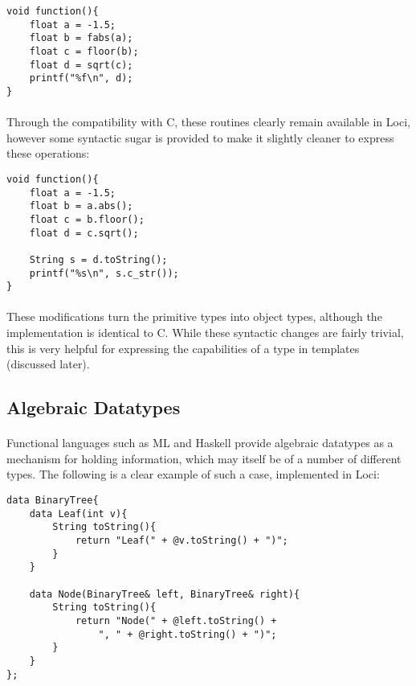 \documentclass[12pt,twoside,notitlepage]{report}
\begin{document}
\small{
\begin{verbatim}
void function(){
    float a = -1.5;
    float b = fabs(a);
    float c = floor(b);
    float d = sqrt(c);
    printf("%f\n", d);
}
\end{verbatim}
}

\paragraph{}
Through the compatibility with C, these routines clearly remain available in Loci, however some syntactic sugar is provided to make it slightly cleaner to express these operations:

\small{
\begin{verbatim}
void function(){
    float a = -1.5;
    float b = a.abs();
    float c = b.floor();
    float d = c.sqrt();
    
    String s = d.toString();
    printf("%s\n", s.c_str());
}
\end{verbatim}
}

\paragraph{}
These modifications turn the primitive types into object types, although the implementation is identical to C. While these syntactic changes are fairly trivial, this is very helpful for expressing the capabilities of a type in templates (discussed later).

\subsection{Algebraic Datatypes}

\paragraph{}
Functional languages such as ML and Haskell provide algebraic datatypes as a mechanism for holding information, which may itself be of a number of different types. The following is a clear example of such a case, implemented in Loci:

\small{
\begin{verbatim}
data BinaryTree{
    data Leaf(int v){
        String toString(){
            return "Leaf(" + @v.toString() + ")";
        }
    }
    
    data Node(BinaryTree& left, BinaryTree& right){
        String toString(){
            return "Node(" + @left.toString() +
                ", " + @right.toString() + ")";
        }
    }
};
\end{verbatim}
}
\end{document}
